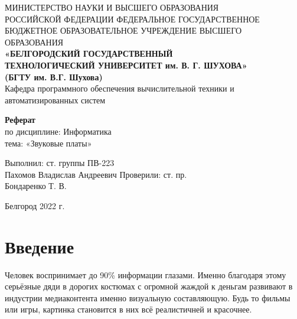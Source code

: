 \documentclass[a4paper,12pt]{extarticle}
\begin{document}
    \linespread{1.5}
    \setlength{\parskip}{0cm}

    \newcommand\textbox[1]{
        \parbox{.45\textwidth}{#1}
    }


    \justifying

    \begin{center}
        \small{
            МИНИСТЕРСТВО НАУКИ И ВЫСШЕГО ОБРАЗОВАНИЯ \\РОССИЙСКОЙ ФЕДЕРАЦИИ
            \bigbreak
            ФЕДЕРАЛЬНОЕ ГОСУДАРСТВЕННОЕ БЮДЖЕТНОЕ ОБРАЗОВАТЕЛЬНОЕ УЧРЕЖДЕНИЕ ВЫСШЕГО ОБРАЗОВАНИЯ \\
            \bigbreak
            \textbf{«БЕЛГОРОДСКИЙ ГОСУДАРСТВЕННЫЙ \\ТЕХНОЛОГИЧЕСКИЙ УНИВЕРСИТЕТ им. В. Г. ШУХОВА»\\ (БГТУ им. В.Г. Шухова)} \\
            \bigbreak
            Кафедра программного обеспечения вычислительной техники и автоматизированных систем\\}
    \end{center}

    \vfill
    \begin{center}
        \large{
            \textbf{
                Реферат }}\\
        \normalsize{
            по дисциплине: Информатика \\
            тема: «Звуковые платы»}
    \end{center}
    \vfill
    \hfill\textbox{
        Выполнил: ст. группы ПВ-223\\Пахомов Владислав Андреевич
        \bigbreak
        Проверили: ст. пр.\\Бондаренко Т. В.
    }
    \vfill\begin{center}
              Белгород 2022 г.
    \end{center}
    \newpage
    \renewcommand{\contentsname}{Оглавление}
    \tableofcontents\newpage


    \section{Введение}
    Человек воспринимает до 90\% информации глазами. Именно благодаря этому серьёзные дяди в дорогих костюмах с огромной жаждой к деньгам развивают в индустрии медиаконтента именно визуальную составляющую. Будь то фильмы или игры, картинка становится в них всё реалистичней и красочнее.
\end{document}
